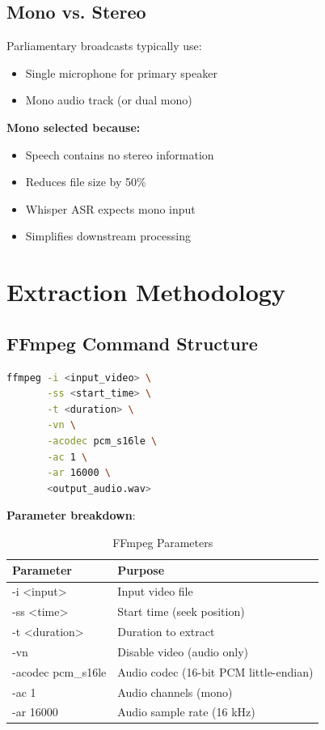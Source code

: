 \documentclass[11pt,a4paper]{article}
\begin{document}
\subsection{Mono vs. Stereo}

Parliamentary broadcasts typically use:
\begin{itemize}
    \item Single microphone for primary speaker
    \item Mono audio track (or dual mono)
\end{itemize}

\textbf{Mono selected because:}
\begin{itemize}
    \item Speech contains no stereo information
    \item Reduces file size by 50\%
    \item Whisper ASR expects mono input
    \item Simplifies downstream processing
\end{itemize}

\section{Extraction Methodology}

\subsection{FFmpeg Command Structure}

\begin{lstlisting}[language=Bash]
ffmpeg -i <input_video> \
       -ss <start_time> \
       -t <duration> \
       -vn \
       -acodec pcm_s16le \
       -ac 1 \
       -ar 16000 \
       <output_audio.wav>
\end{lstlisting}

\textbf{Parameter breakdown}:

\begin{table}[htbp]
\centering
\caption{FFmpeg Parameters}
\begin{tabular}{@{}ll@{}}
\toprule
\textbf{Parameter} & \textbf{Purpose} \\ \midrule
-i <input> & Input video file \\
-ss <time> & Start time (seek position) \\
-t <duration> & Duration to extract \\
-vn & Disable video (audio only) \\
-acodec pcm\_s16le & Audio codec (16-bit PCM little-endian) \\
-ac 1 & Audio channels (mono) \\
-ar 16000 & Audio sample rate (16 kHz) \\
\bottomrule
\end{tabular}
\end{table}
\end{document}

